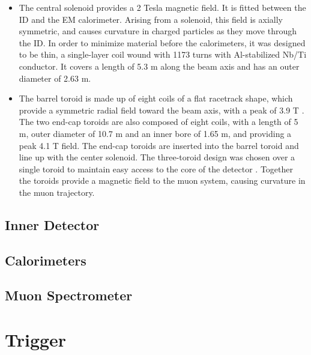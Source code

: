 \begin{itemize}
    \item The central solenoid provides a 2 Tesla magnetic field. It is fitted between the \gls{ID} and the \gls{EM} calorimeter. Arising from a solenoid, this field is axially symmetric, and causes curvature in charged particles as they move through the \gls{ID}. In order to minimize material before the calorimeters, it was designed to be thin, a single-layer coil wound with 1173 turns with Al-stabilized Nb/Ti conductor. It covers a length of 5.3 m along the beam axis and has an outer diameter of 2.63 m\cite{central-solenoid}.

    \item The barrel toroid is made up of eight coils of a flat racetrack shape, which provide a symmetric radial field toward the beam axis, with a peak of 3.9 T \cite{barrel-toroid}. The two end-cap toroids are also composed of eight coils, with a length of 5 m, outer diameter of 10.7 m and an inner bore of 1.65 m, and providing a peak 4.1 T field. The end-cap toroids are inserted into the barrel toroid and line up with the center solenoid. The three-toroid design was chosen over a single toroid to maintain easy access to the core of the detector \cite{endcap-toroid}. Together the toroids provide a magnetic field to the muon system, causing curvature in the muon trajectory.
\end{itemize}


\subsection{Inner Detector}
\subsection{Calorimeters}
\subsection{Muon Spectrometer}
\section{Trigger}


